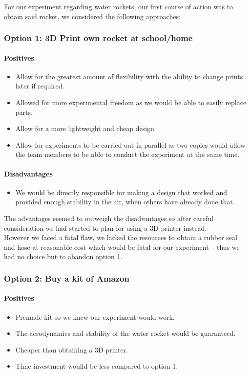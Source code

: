 \documentclass[14pt]{article}
\begin{document}
For our experiment regarding water rockets, our first course of action was to obtain said rocket, we considered the following approaches:
\subsubsection{Option 1: 3D Print own rocket at school/home}
\paragraph{Positives}
\begin{itemize}
    \item Allow for the greatest amount of flexibility with the ability to change prints later if required.
    \item Allowed for more experimental freedom as we would be able to easily replace parts.
    \item Allow for a more lightweight and cheap design
    \item Allow for experiments to be carried out in parallel as two copies would allow the team members to be able to conduct the experiment at the same time.
\end{itemize}
\paragraph{Disadvantages}
\begin{itemize}
    \item We would be directly responsible for making a design that worked and provided enough stability in the air, when others have already done that.

\end{itemize}
The advantages seemed to outweigh the disadvantages so after careful consideration we had started to plan for using a 3D printer instead.\\
However we faced a fatal flaw, we lacked the resources to obtain a rubber seal and hose at reasonable cost which would be fatal for our experiment -- thus we had no choice but to abandon option 1.
\subsubsection{Option 2: Buy a kit of Amazon}
\paragraph{Positives}
\begin{itemize}
    \item Premade kit so we knew our experiment would work.
    \item The aerodynamics and stability of the water rocket would be guaranteed.
    \item Cheaper than obtaining a 3D printer.
    \item Time investment woulld be less compared to option 1.
\end{itemize}
\end{document}
